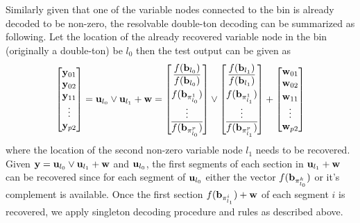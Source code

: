 Similarly given that one of the variable nodes connected to the bin is already decoded to be non-zero, the resolvable double-ton decoding can be summarized as following. Let the location of the already recovered variable node in the bin (originally a double-ton) be $l_0$ then the test output can be given as 
\begin{align*}
\begin{bmatrix}
\mbf{y}_{01}\\
\mbf{y}_{02}\\
\mbf{y}_{11}\\
\vdots \\
\mbf{y}_{p2}\\
\end{bmatrix}
=\mbf{u}_{l_0} \vee \mbf{u}_{l_1}+\mbf{w}=
\begin{bmatrix}
f(\mbf{b}_{l_0})\\
\vspace{2pt}
\overline{f(\mbf{b}_{l_0})}\\
f(\mbf{b}_{\pi^1_{l_0}})\\
\vdots \\
\overline{f(\mbf{b}_{\pi^{p}_{l_0}})}\\
\end{bmatrix} 
\vee
\begin{bmatrix}
f(\mbf{b}_{l_1})\\
\vspace{2pt}
\overline{f(\mbf{b}_{l_1})}\\
f(\mbf{b}_{\pi^1_{l_1}})\\
\vdots \\
\overline{f(\mbf{b}_{\pi^{p}_{l_1}})}\\
\end{bmatrix}+
\begin{bmatrix}
\mbf{w}_{01}\\
\vspace{2pt}
\mbf{w}_{02}\\
\mbf{w}_{11}\\
\vdots \\
\mbf{w}_{p2}\\
\end{bmatrix}
\end{align*} 
where the location of the second non-zero variable node $l_1$ needs to be recovered. Given $\mathbf{y}=\mathbf{u}_{l_0} \vee \mathbf{u}_{l_1}+\mathbf{w}$ and $\mathbf{u}_{l_0}$, the first segments of each section in $\mathbf{u}_{l_1}+\mathbf{w}$ can be recovered since for each segment of $\mathbf{u}_{l_0}$ either the vector $f(\mathbf{b}_{\pi^k_{l_0}})$ or it's complement is available. Once the first section $f(\mathbf{b}_{\pi_{l_1}^i})+\mathbf{w}$ of each segment $i$ is recovered, we apply singleton decoding procedure and rules as described above.


